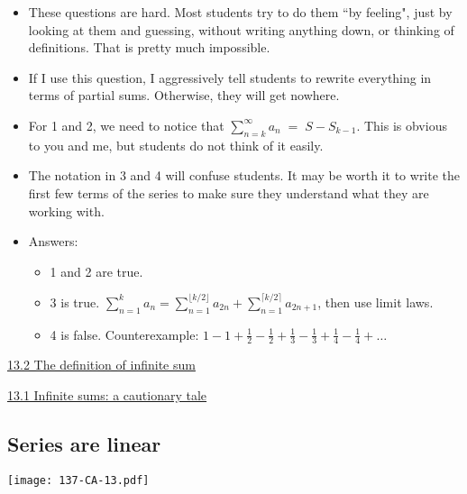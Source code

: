 \documentclass[11pt]{article}
\newcommand {\DS} [1] {${\displaystyle #1}$}
\newcommand{\nl}{\hfill \vspace{-1.1\baselineskip}} %
\newcommand{\vi}{\hspace{8mm} \href{https://www.youtube.com/watch?v=vJCGp9luzlc&list=PLlwePzQY_wW-FJMnD_ybkXU_jZLVtZttI}{13.1 Infinite sums: a cautionary tale} }
\newcommand{\vii}{\hspace{8mm} \href{https://www.youtube.com/watch?v=VccmKguRkeY&list=PLlwePzQY_wW-FJMnD_ybkXU_jZLVtZttI&index=2}{13.2 The definition of infinite sum} }
\begin{document}
\begin{comments}
\nl
	\begin{itemize}
		\item   These questions are hard.  Most students try to do them ``by feeling", just by looking at them and guessing, without writing anything down, or thinking of definitions.  That is pretty much impossible.

		\item If I use this question, I aggressively tell students to rewrite everything in terms of partial sums.  Otherwise, they will get nowhere.

		
		\item For 1 and 2, we need to notice that \DS{\sum_{n=k}^{\infty} a_n \; = \; S - S_{k-1}}.  This is obvious to you and me, but students do not think of it easily.
		
		\item The notation in 3 and 4 will confuse students.  It may be worth it to write the first few terms of the series to make sure they understand what they are working with.
		
		\item Answers:
			\begin{itemize}
				\item 1 and 2 are true.   
				\item  3 is true.   \DS{\sum_{n=1}^{k} a_n = \sum_{n=1}^{\lfloor k/2 \rfloor} a_{2n} + \sum_{n=1}^{\lceil k/2 \rceil }a_{2n+1}}, then use limit laws.
				\item 4 is false.  Counterexample:  \DS{1 - 1 + \frac{1}{2} - \frac{1}{2} + \frac{1}{3} - \frac{1}{3} + \frac{1}{4} - \frac{1}{4} + \ldots}
			\end{itemize}
	\end{itemize}
\end{comments}

\begin{videos}
\vii

\vi
\end{videos}

\newpage
\subsection{Series are linear}

\begin{center}
{ \texttt{[image: 137-CA-13.pdf]}} 
\end{center}
\end{document}
